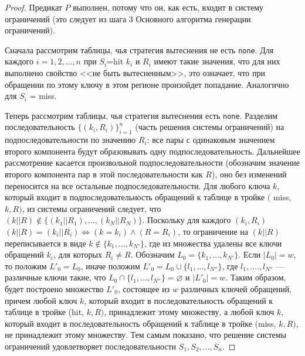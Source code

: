 \begin{theorem}\label{mirror_correctness}
\CorrectnessMirror
\end{theorem}
\begin{proof}
  Предикат $P$ выполнен, потому что он, как есть, входит в систему ограничений (это следует из шага 3 Основного алгоритма генерации ограничений).

  Сначала рассмотрим таблицы, чья стратегия вытеснения не есть \texttt{none}. Для каждого $i = 1, 2, ..., n$ при $S_i${=}hit  $k_i$ и $R_i$ имеют такие значения, что для них выполнено свойство <<не быть вытесненным>>, это означает, что при обращении по этому ключу в этом регионе произойдет попадание. Аналогично для $S_i$ = miss.

  Теперь рассмотрим таблицы, чья стратегия вытеснения есть \texttt{none}. Разделим последовательность $\{(k_i, R_i)\}_{i=1}^n$ (часть решения системы ограничений) на подпоследовательности по значению $R_i$: все пары с одинаковым значением второго компонента будут образовывать одну подпоследовательность. Дальнейшее рассмотрение касается произвольной подпоследовательности (обозначим значение второго компонента пар в этой последовательности как $R$), оно без изменений переносится на все остальные подпоследовательности. Для любого ключа $k$, который входит в подпоследовательность обращений к таблице в тройке $($ miss, $k, R)$, из системы ограничений следует, что $(k||R) \notin \{(k_1||R_1), ..., (k_N||R_N)\}$. Поскольку для каждого $(k_i, R_i)$ $(k||R) = (k_i||R_i) \Leftrightarrow (k = k_i) \wedge (R = R_i)$, то ограничение на $(k||R)$ переписывается в виде $k \notin \{k_1, ..., k_{N'}\}$, где из множества удалены все ключи обращений $k_i$, для которых $R_i \neq R$. Обозначим $L_0 = \{k_1, ..., k_{N'}\}$. Если $|L_0| = w$, то положим $L'_0 = L_0$, иначе положим $L'_0 = L_0 \cup \{l_1, ..., l_{N''}\}$, где $l_1, ...., l_{N''}$ --- различные ключи такие, что $L_0 \cap \{l_1, ..., l_{N''}\} = \varnothing$ и $|L'_0| = w$. Таким образом, будет построено множество $L'_0$, состоящее из $w$ различных ключей обращений, причем любой ключ $k$, который входит в последовательность обращений к таблице в тройке (hit, $k, R)$, принадлежит этому множеству, а любой ключ $k$, который входит в последовательность обращений к таблице в тройке (miss, $k, R)$, не принадлежит этому множеству. Тем самым показано, что решение системы ограничений удовлетворяет последовательности $S_1, S_2, ..., S_n$.
\end{proof}

